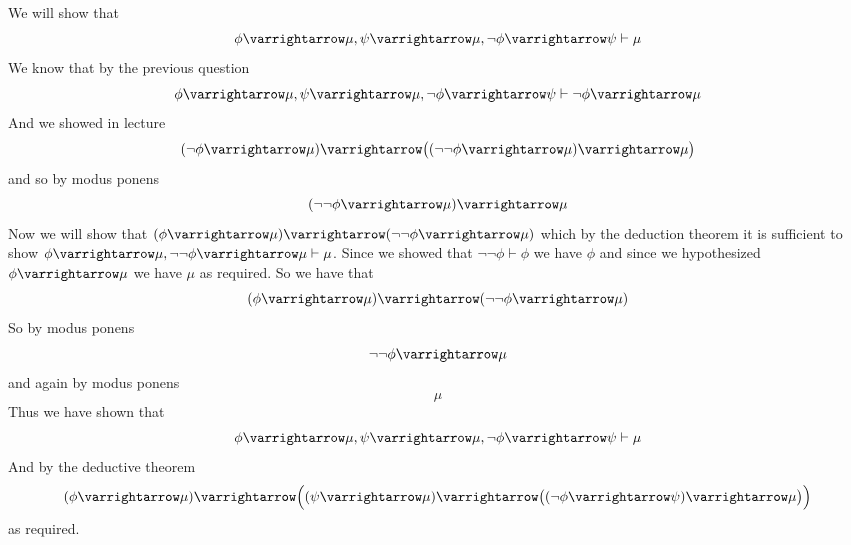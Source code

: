 \documentclass[10pt]{article}
\let\to=\varrightarrow
\begin{document}
\begin{blankpp}
        \item We will show that
        \[ \phi\to\mu, \psi\to\mu, \neg\phi\to\psi \vdash \mu \]
        We know that by the previous question
        \[ \phi\to\mu, \psi\to\mu, \neg\phi\to\psi \vdash \neg\phi\to\mu \]
        And we showed in lecture
        \[ (\neg\phi\to\mu) \to \bigl((\neg\neg\phi\to\mu)\to\mu\bigr) \]
        and so by modus ponens
        \[ (\neg\neg\phi\to\mu)\to\mu \]
        Now we will show that $(\phi\to\mu)\to(\neg\neg\phi\to\mu)$ which by the deduction theorem it is sufficient to show $\phi\to\mu, \neg\neg\phi\to\mu\vdash\mu$.
        Since we showed that $\neg\neg\phi\vdash\phi$ we have $\phi$ and since we hypothesized $\phi\to\mu$ we have $\mu$ as required.
        So we have that
        \[ (\phi\to\mu)\to(\neg\neg\phi\to\mu) \]
        So by modus ponens
        \[ \neg\neg\phi\to\mu \]
        and again by modus ponens
        \[ \mu \]
        Thus we have shown that
        \[ \phi\to\mu, \psi\to\mu, \neg\phi\to\psi \vdash \mu \]
        And by the deductive theorem
        \[ (\phi\to\mu)\to\Bigl((\psi\to\mu)\to\bigl((\neg\phi\to\psi)\to\mu\bigr)\Bigr) \]
        as required.

    \eenum

\end{blankpp}
\end{document}
